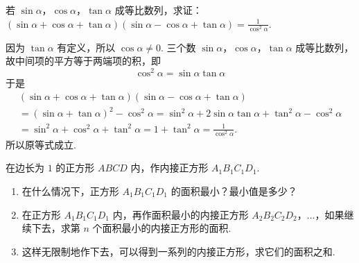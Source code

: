 \begin{problem}
若 \(\sin\alpha\)，\(\cos\alpha\)，\(\tan\alpha\) 成等比数列，求证：\(\left(\sin\alpha+\cos\alpha+\tan\alpha\right)\left(\sin\alpha-\cos\alpha+\tan\alpha\right)=\frac{1}{\cos^2\alpha} \).
\end{problem}

\begin{solution}
因为 \(\tan\alpha\) 有定义，所以 \(\cos\alpha\neq0\). 三个数 \(\sin\alpha\)，\(\cos\alpha\)，\(\tan\alpha\) 成等比数列，故中间项的平方等于两端项的积，即
\[
\cos^2\alpha=\sin\alpha\tan\alpha
\]
于是
\[
\begin{gathered}
\left(\sin\alpha+\cos\alpha+\tan\alpha\right)\left(\sin\alpha-\cos\alpha+\tan\alpha\right)\\
=\left(\sin\alpha+\tan\alpha\right)^2-\cos^2\alpha
=\sin^2\alpha+2\sin\alpha\tan\alpha+\tan^2\alpha-\cos^2\alpha\\
=\sin^2\alpha+\cos^2\alpha+\tan^2\alpha
=1+\tan^2\alpha=\frac{1}{\cos^2\alpha}.
\end{gathered}
\]
所以原等式成立.
\end{solution}

\begin{problem}
在边长为 \(1\) 的正方形 \(ABCD\) 内，作内接正方形 \(A_1B_1C_1D_1\).

\begin{enumerate}
\item 在什么情况下，正方形 \(A_1B_1C_1D_1\) 的面积最小？最小值是多少？

\item 在正方形 \(A_1B_1C_1D_1\) 内，再作面积最小的内接正方形 \(A_2B_2C_2D_2\)，\(\ldots\)，如果继续下去，求第 \(n\) 个面积最小的内接正方形的面积.

\item 这样无限制地作下去，可以得到一系列的内接正方形，求它们的面积之和.
\end{enumerate}

\end{problem}

